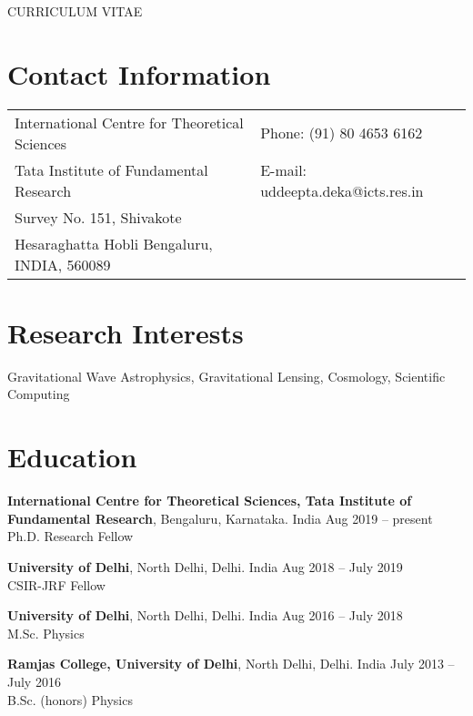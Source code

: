\documentclass[margin,line]{res}
\begin{document}
\centerline{\Large CURRICULUM VITAE}


\begin{resume}
\section{\sc Contact Information}

\vspace{.05in}
\begin{tabular}{@{}p{3.5in}p{3in}}
International Centre for Theoretical Sciences             & {Phone:}  (91) 80 4653 6162 \\
Tata Institute of Fundamental Research
 & {E-mail:}  uddeepta.deka@icts.res.in\\
Survey No. 151, Shivakote \\
Hesaraghatta Hobli
Bengaluru, INDIA, 560089
\end{tabular}


\section{\sc Research Interests}

Gravitational Wave Astrophysics, Gravitational Lensing, Cosmology, Scientific Computing

\section{\sc Education}
{\bf International Centre for Theoretical Sciences, Tata Institute of Fundamental Research}, Bengaluru, Karnataka. India \hfill Aug 2019 -- present\\
Ph.D. Research Fellow

{\bf University of Delhi}, North Delhi, Delhi. India \hfill Aug 2018 -- July 2019\\
CSIR-JRF Fellow

{\bf University of Delhi}, North Delhi, Delhi. India \hfill Aug 2016 -- July 2018\\
M.Sc. Physics 

{\bf Ramjas College, University of Delhi}, North Delhi, Delhi. India \hfill July 2013 -- July 2016\\
B.Sc. (honors) Physics 



\end{resume}
\end{document}
